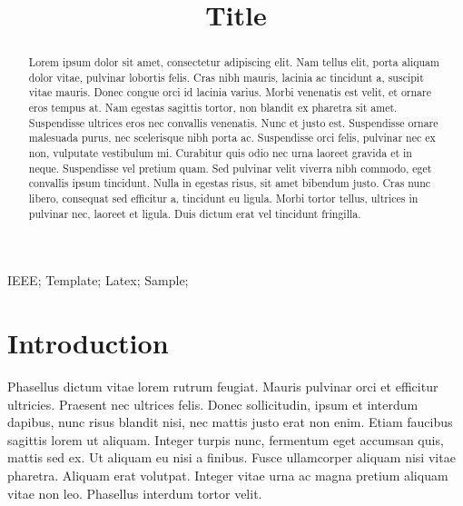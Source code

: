 \documentclass[10pt,conference]{IEEEtran}
\begin{document}
\title{Title\\}

\author{
}

\maketitle

\begin{abstract}
  Lorem ipsum dolor sit amet, consectetur adipiscing elit. Nam tellus elit, porta aliquam dolor vitae, pulvinar lobortis felis. Cras nibh mauris, lacinia ac tincidunt a, suscipit vitae mauris. Donec congue orci id lacinia varius. Morbi venenatis est velit, et ornare eros tempus at. Nam egestas sagittis tortor, non blandit ex pharetra sit amet. Suspendisse ultrices eros nec convallis venenatis. Nunc et justo est. Suspendisse ornare malesuada purus, nec scelerisque nibh porta ac. Suspendisse orci felis, pulvinar nec ex non, vulputate vestibulum mi. Curabitur quis odio nec urna laoreet gravida et in neque. Suspendisse vel pretium quam. Sed pulvinar velit viverra nibh commodo, eget convallis ipsum tincidunt. Nulla in egestas risus, sit amet bibendum justo. Cras nunc libero, consequat sed efficitur a, tincidunt eu ligula. Morbi tortor tellus, ultrices in pulvinar nec, laoreet et ligula. Duis dictum erat vel tincidunt fringilla.
\end{abstract}

\begin{IEEEkeywords}
  IEEE; Template; Latex; Sample;
\end{IEEEkeywords}


\section{Introduction}
  Phasellus dictum vitae lorem rutrum feugiat. Mauris pulvinar orci et efficitur ultricies. Praesent nec ultrices felis. Donec sollicitudin, ipsum et interdum dapibus, nunc risus blandit nisi, nec mattis justo erat non enim. Etiam faucibus sagittis lorem ut aliquam. Integer turpis nunc, fermentum eget accumsan quis, mattis sed ex. Ut aliquam eu nisi a finibus. Fusce ullamcorper aliquam nisi vitae pharetra. Aliquam erat volutpat. Integer vitae urna ac magna pretium aliquam vitae non leo. Phasellus interdum tortor velit.
\end{document}
